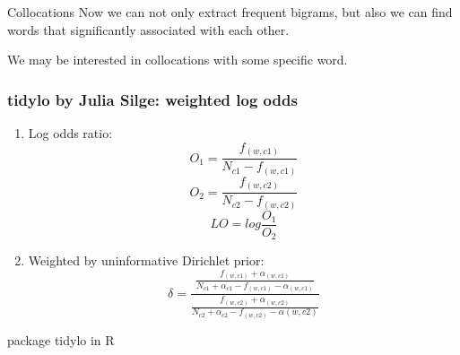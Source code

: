 \documentclass[svgnames]{beamer}
\begin{document}
\begin{frame}{Collocations}
  Now we can not only extract frequent bigrams, but also we can find words that significantly associated with each other.

  We may be interested in collocations with some specific word.
\end{frame}


\begin{frame}
  \frametitle{tidylo by Julia Silge: weighted log odds}
  \begin{enumerate}
  \item Log odds ratio:
    $$
    O_1 = \frac{f_{(w,c1)}}{N_{c1}-f_{(w,c1)}}
    $$
    $$
    O_2 = \frac{f_{(w,c2)}}{N_{c2}-f_{(w,c2)}}
    $$
    $$
    LO = log \frac{O_1}{O_2}
    $$
  \item Weighted by uninformative Dirichlet prior:
    $$
    \delta =
    \frac{\frac{f_{(w,c1)}+\alpha_{(w,c1)}}{N_{c1}+\alpha_{c1}-f_{(w,c1)}-\alpha_{(w,c1)}}}{\frac{f_{(w,c2)}+\alpha_{(w,c2)}}{N_{c2}+\alpha_{c2}-f_{(w,c2)}-\alpha{(w,c2)}}}
    $$
  \end{enumerate}

  package tidylo in R
\end{frame}
\end{document}
